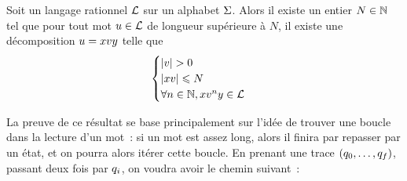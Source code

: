 \begin{lemma}[de l'étoile]
  Soit un langage rationnel $\mathcal L$ sur un alphabet $\Sigma$. Alors il existe un
  entier $N \in \mathbb N$ tel que pour tout mot $u\in\mathcal L$ de longueur
  supérieure à $N$, il existe une décomposition $u = xvy$
  telle que
  \[\begin{cases}
  |v| > 0\\
  |xv| \leqslant N\\
  \forall n \in \mathbb N, xv^ny \in \mathcal L
  \end{cases}\]
\end{lemma}

La preuve de ce résultat se base principalement sur l'idée de trouver une boucle
dans la lecture d'un mot~: si un mot est assez long, alors il finira par
repasser par un état, et on pourra alors itérer cette boucle. En prenant
une trace $(q_{0},\ldots,q_{f})$, passant deux fois par $q_{i}$, on
voudra avoir le chemin suivant~:

\begin{figure}[H]
  \centering
\end{figure}

